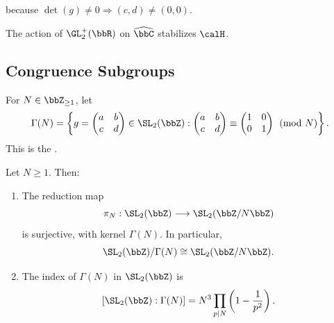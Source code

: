 because $\det(g) \ne 0 \Longrightarrow (c, d) \ne (0, 0)$.

\begin{corollary}\label{Cor:MF_half_plane}
    The action of $\GL_2^+(\bbR)$ on $\widehat{\bbC}$ stabilizes $\calH$.
\end{corollary}

\subsection{Congruence Subgroups}\label{Sec:MF_congruence}
For $N \in \bbZ_{\ge 1}$, let
\[
    \Gamma(N) = \left\{g = \begin{pmatrix}a & b\\ c & d\end{pmatrix} \in \SL_2(\bbZ) :
    \begin{pmatrix}a & b\\ c & d\end{pmatrix} \equiv
    \begin{pmatrix}1 & 0\\ 0 & 1\end{pmatrix}\pmod N\right\}.
\]
This is the .

\begin{proposition}\label{Prop:MF_principal_index}
    Let $N \ge 1$. Then:
    \begin{enumerate}[label=(\arabic*)]
        \item The reduction map
        \[
            \pi_N : \SL_2(\bbZ) \longrightarrow \SL_2(\bbZ/N\bbZ)
        \]
        is surjective, with kernel $\Gamma(N)$. In particular,
        \[
            \SL_2(\bbZ)/\Gamma(N) \cong \SL_2(\bbZ/N\bbZ).
        \]
        \item The index of $\Gamma(N)$ in $\SL_2(\bbZ)$ is
        \[
            [\SL_2(\bbZ) : \Gamma(N)]
            = N^3\prod_{p \mid N}\left(1 - \frac{1}{p^2}\right).
        \]
    \end{enumerate}
\end{proposition}

